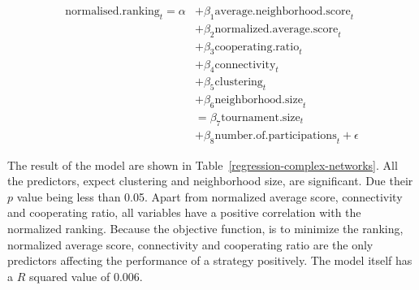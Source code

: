 \begin{align}
	\mathrm{normalised.ranking}_{t} = \alpha
	  & + \beta_{1}  \mathrm{average.neighborhood.score}_{t}          \\
	  & + \beta_{2}  \mathrm{normalized.average.score}_{t}            \\
	  & + \beta_{3}  \mathrm{cooperating.ratio}_{t}                   \\
	  & + \beta_{4}  \mathrm{connectivity}_{t}                        \\
	  & + \beta_{5}  \mathrm{clustering}_{t}                          \\
	  & + \beta_{6}  \mathrm{neighborhood.size}_{t}                   \\
	  & = \beta_{7}  \mathrm{tournament.size}_{t}                     \\
	  & + \beta_{8}  \mathrm{number.of.participations}_{t} + \epsilon
\end{align}

The result of the model are shown in Table~\ref{regression-complex-networks}.
All the predictors, expect clustering and neighborhood size, are significant.
Due their \(p\) value being less than 0.05.
Apart from normalized average score, connectivity and cooperating ratio, all
variables have a positive correlation with the normalized ranking. Because the
objective function, is to minimize the ranking, normalized average score,
connectivity and cooperating ratio are the only predictors affecting the performance
of a strategy positively. The model itself has a \(R\) squared value of 0.006.

